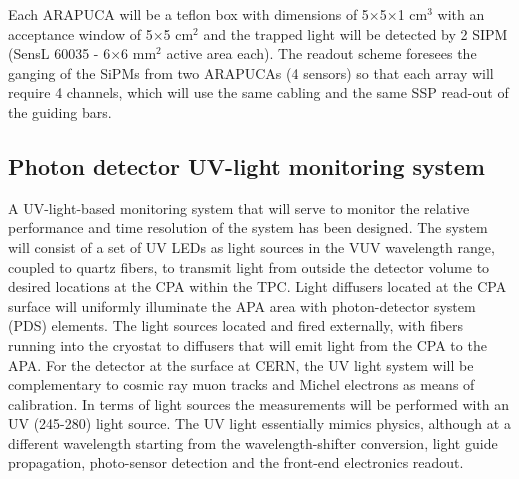 Each ARAPUCA will be a teflon box with dimensions of 5$\times$5$\times$1 cm$^3$ with an acceptance window of 5$\times$5 
cm$^2$ and the trapped light will be detected by 2 SIPM (SensL 60035 - 6$\times$6 mm$^2$ active area each). The readout scheme foresees the ganging of the SiPMs from two ARAPUCAs (4 sensors) so that each array will require 4 channels, which will use the same cabling and the same SSP read-out of the guiding bars.

\subsection{Photon detector UV-light monitoring system}
\label{sec_pd_calib}


A UV-light-based monitoring system that will serve to monitor the relative performance and time resolution of the system has been designed. %
The system will consist of a set of UV LEDs as light sources in the VUV wavelength range, coupled to quartz fibers, to transmit light from outside the detector volume to desired locations at the CPA within the TPC.
Light diffusers located at the CPA surface will uniformly illuminate the APA area with photon-detector system (PDS) elements.
The light sources located and fired externally, with fibers running into the cryostat to diffusers that will emit light from the CPA to the APA. 
For the detector %
at the surface at CERN, the UV light system will be complementary to cosmic ray muon 
tracks and Michel electrons as means of calibration. In terms of light sources the measurements will be performed with an UV (245-280) light source.
The UV light essentially mimics physics, although at a different wavelength starting from the wavelength-shifter conversion, 
light guide propagation, photo-sensor detection and the front-end electronics readout.
	
